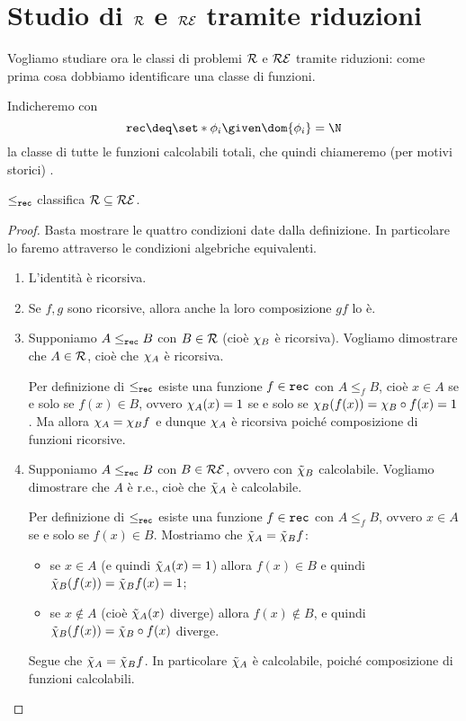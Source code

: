 \section{Studio di \texorpdfstring{$\mathcal{R}$ e $\mathcal{RE}$}{R e RE} tramite riduzioni}

Vogliamo studiare ora le classi di problemi $\mathcal{R}$ e $\mathcal{RE}$ tramite riduzioni: come prima cosa dobbiamo identificare una classe di funzioni. 

\begin{definition}
    Indicheremo con \[
        \rec \deq \set*{\phi_i \given \dom{\phi_i} = \N}
    \] la classe di tutte le funzioni calcolabili totali, che quindi chiameremo (per motivi storici) .
\end{definition}

\begin{proposition}
    $\leq_{\texttt{rec}}$ classifica $\mathcal{R} \subseteq \mathcal{RE}$. 
\end{proposition}
\begin{proof}
    Basta mostrare le quattro condizioni date dalla definizione. In particolare lo faremo attraverso le condizioni algebriche equivalenti.
    \begin{enumerate}
        \item L'identità è ricorsiva.
        \item Se $f, g$ sono ricorsive, allora anche la loro composizione $gf$ lo è.
        \item Supponiamo $A \leq_{\texttt{rec}} B$ con $B \in \mathcal{R}$ (cioè $\chi_{B}$ è ricorsiva). Vogliamo dimostrare che $A \in \mathcal{R}$, cioè che $\chi_{A}$ è ricorsiva.
        
        Per definizione di $\leq_{\texttt{rec}}$ esiste una funzione $f \in \texttt{rec}$ con $A \leq_f B$, cioè $x \in A$ se e solo se $f(x) \in B$, ovvero $\chi_{A}(x) = 1$ se e solo se $\chi_{B}(f(x)) = \chi_{B} \circ f(x) = 1$. Ma allora $\chi_{A} = \chi_{B}f$ e dunque $\chi_{A}$ è ricorsiva poiché composizione di funzioni ricorsive.
        \item Supponiamo $A \leq_{\texttt{rec}} B$ con $B \in \mathcal{RE}$, ovvero con $\tilde{\chi}_{B}$ calcolabile. Vogliamo dimostrare che $A$ è r.e., cioè che $\tilde{\chi}_{A}$ è calcolabile.
        
        Per definizione di $\leq_{\texttt{rec}}$ esiste una funzione $f \in \texttt{rec}$ con $A \leq_f B$, ovvero $x \in A$ se e solo se $f(x) \in B$.
        Mostriamo che $\tilde{\chi}_{A} = \tilde{\chi}_{B}f$:
        \begin{itemize}
            \item se $x \in A$ (e quindi $\tilde{\chi}_{A}(x) = 1$) allora $f(x) \in B$ e quindi $\tilde{\chi}_{B}(f(x)) = \tilde{\chi}_{B}f(x) = 1$;
            \item se $x \notin A$ (cioè $\tilde{\chi}_{A}(x)$ diverge) allora $f(x) \notin B$, e quindi $\tilde{\chi}_{B}(f(x)) = \tilde{\chi}_{B} \circ f(x)$ diverge.
        \end{itemize}
        
        Segue che $\tilde{\chi}_{A} = \tilde{\chi}_{B}f$. In particolare $\tilde{\chi}_{A}$ è calcolabile, poiché composizione di funzioni calcolabili.  \qedhere
    \end{enumerate}
\end{proof}

